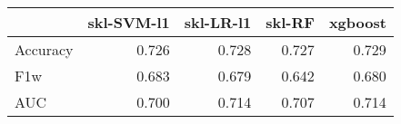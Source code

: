 \begin{tabular}{lrrrr}
\toprule
{} &  skl-SVM-l1 &  skl-LR-l1 &  skl-RF &  xgboost \\
\midrule
Accuracy &       0.726 &      0.728 &   0.727 &    0.729 \\
F1w      &       0.683 &      0.679 &   0.642 &    0.680 \\
AUC      &       0.700 &      0.714 &   0.707 &    0.714 \\
\bottomrule
\end{tabular}
